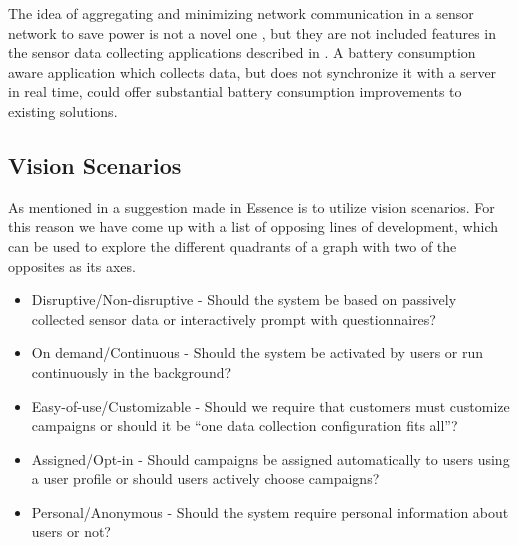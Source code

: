 The idea of aggregating and minimizing network communication in a sensor network to save power is not a novel one \parencite{korteweg2007data} \parencite{mhatre2004design}, but they are not included features in the sensor data collecting applications described in . A battery consumption aware application which collects data, but does not synchronize it with a server in real time, could offer substantial battery consumption improvements to existing solutions. 

\subsection{Vision Scenarios}
\label{sub:vision_scenarios}

As mentioned in  a suggestion made in Essence is to utilize vision scenarios. For this reason we have come up with a list of opposing lines of development, which can be used to explore the different quadrants of a graph with two of the opposites as its axes.

\begin{itemize}[itemsep=0.1em]
	\item Disruptive/Non-disruptive - Should the system be based on passively collected sensor data or interactively prompt with questionnaires? %
	\item On demand/Continuous - Should the system be activated by users or run continuously in the background? %
	\item Easy-of-use/Customizable - Should we require that customers must customize campaigns or should it be ``one data collection configuration fits all''? %
	\item Assigned/Opt-in - Should campaigns be assigned automatically to users using a user profile or should users actively choose campaigns? %
	\item Personal/Anonymous - Should the system require personal information about users or not? %
\end{itemize}

